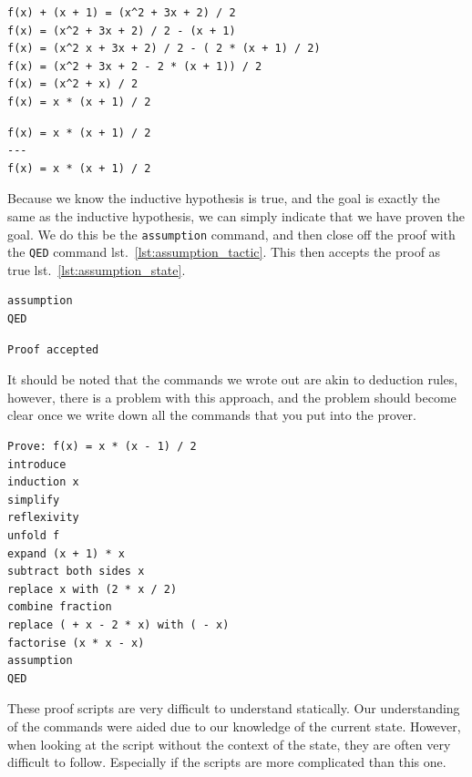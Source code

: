 \documentclass[
]{article}
\newcommand{\passthrough}[1]{#1}
\begin{document}
\begin{lstlisting}[caption={States after running each command}, label=lst:intermediate_states]
f(x) + (x + 1) = (x^2 + 3x + 2) / 2
f(x) = (x^2 + 3x + 2) / 2 - (x + 1)
f(x) = (x^2 x + 3x + 2) / 2 - ( 2 * (x + 1) / 2)
f(x) = (x^2 + 3x + 2 - 2 * (x + 1)) / 2
f(x) = (x^2 + x) / 2
f(x) = x * (x + 1) / 2
\end{lstlisting}

\begin{lstlisting}[caption={Final state after running each command}, label=lst:rearangement_state]
f(x) = x * (x + 1) / 2
---
f(x) = x * (x + 1) / 2
\end{lstlisting}

Because we know the inductive hypothesis is true, and the goal is
exactly the same as the inductive hypothesis, we can simply indicate
that we have proven the goal. We do this be the
\passthrough{\lstinline!assumption!} command, and then close off the
proof with the \passthrough{\lstinline!QED!} command
lst.~\ref{lst:assumption_tactic}. This then accepts the proof as true
lst.~\ref{lst:assumption_state}.

\begin{lstlisting}[caption={Running the assumption tactic}, label=lst:assumption_tactic]
assumption
QED
\end{lstlisting}

\begin{lstlisting}[caption={State after running the assumption tactic}, label=lst:assumption_state]
Proof accepted
\end{lstlisting}

It should be noted that the commands we wrote out are akin to deduction
rules, however, there is a problem with this approach, and the problem
should become clear once we write down all the commands that you put
into the prover.

\begin{lstlisting}[caption={Final Proof script}, label=lst:final_proof_script]
Prove: f(x) = x * (x - 1) / 2
introduce
induction x
simplify
reflexivity
unfold f
expand (x + 1) * x
subtract both sides x
replace x with (2 * x / 2)
combine fraction
replace ( + x - 2 * x) with ( - x)
factorise (x * x - x)
assumption
QED
\end{lstlisting}

These proof scripts are very difficult to understand statically. Our
understanding of the commands were aided due to our knowledge of the
current state. However, when looking at the script without the context
of the state, they are often very difficult to follow. Especially if the
scripts are more complicated than this one.
\end{document}
